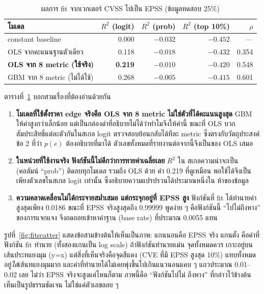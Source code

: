 \begin{table}[H]
\centering
\caption{ผลการ fit จากเวกเตอร์ CVSS ไปเป็น EPSS (ข้อมูลทดสอบ 25\%)}\label{tab:fit}
\footnotesize\setlength{\tabcolsep}{4pt}
\begin{tabular}{p{5.6cm}rrrr}
\toprule
โมเดล & $R^2$ (logit) & $R^2$ (prob) & $R^2$ (top 10\%) & $\rho$ \\
\midrule
constant baseline      & 0.000 & $-0.032$ & $-0.452$ & --- \\
OLS จากคะแนนฐานตัวเดียว & 0.118 & $-0.018$ & $-0.432$ & 0.354 \\
\textbf{OLS จาก 8 metric (ใช้จริง)} & \textbf{0.219} & $-0.010$ & $-0.420$ & 0.548 \\
GBM จาก 8 metric (ไม่ได้ใช้) & 0.268 & $-0.005$ & $-0.415$ & 0.601 \\
\bottomrule
\end{tabular}
\end{table}

ตารางที่~\ref{tab:fit} บอกสามเรื่องที่ต้องอ่านด้วยกัน

\begin{enumerate}[leftmargin=1.6em]
\item \textbf{โมเดลที่ใช้ตั้งราคา edge จริงคือ OLS จาก 8 metric ไม่ใช่ตัวที่ได้คะแนนสูงสุด}
GBM ให้ค่าสูงกว่าเล็กน้อย แต่เป็นกล่องดำที่อธิบายไม่ได้ว่าทำไมจึงให้ค่านี้ ขณะที่ OLS บวก
สัมประสิทธิ์แต่ละตัวกันในสเกล logit ตรวจสอบย้อนกลับได้ทีละ metric ซึ่งตรงกับวัตถุประสงค์
ข้อ 2 ที่ว่า $p(e)$ ต้องอธิบายที่มาได้ ตัวเลขทั้งหมดที่รายงานต่อจากนี้จึงเป็นของ OLS เสมอ
\item \textbf{ในหน่วยที่ใช้งานจริง ฟังก์ชันนี้ไม่ดีกว่าการทายค่าเฉลี่ยเลย} $R^2$ ใน
สเกลความน่าจะเป็น (คอลัมน์ ``prob'') ติดลบทุกโมเดล รวมถึง OLS ด้วย ค่า 0.219 ที่ดูเหมือน
พอใช้ได้จึงเป็นเพียงตัวเลขในสเกล logit เท่านั้น ซึ่งอธิบายความแปรปรวนได้ประมาณหนึ่งใน
ห้าของข้อมูล
\item \textbf{ความคลาดเคลื่อนไม่ได้กระจายสม่ำเสมอ แต่กระจุกอยู่ที่ EPSS สูง} ฟังก์ชันที่ fit
ได้ทำนายค่าสูงสุดเพียง 0.0186 ขณะที่ EPSS จริงสูงสุดถึง 0.99999 พูดง่าย ๆ คือฟังก์ชันนี้
``ไปไม่ถึงหาง'' ของการแจกแจง จึงถดถอยเข้าหาค่าฐาน (base rate) ที่ประมาณ 0.0055 แทน
\end{enumerate}

รูปที่~\ref{fig:fitscatter} แสดงข้อสามข้างต้นให้เห็นเป็นภาพ: แกนนอนคือ EPSS จริง แกนตั้ง
คือค่าที่ฟังก์ชัน fit ทำนาย (ทั้งสองแกนเป็น log scale) ถ้าฟังก์ชันทำนายแม่น จุดทั้งหมดควร
เกาะอยู่บนเส้นประทแยงมุม (y=x) แต่สิ่งที่เห็นจริงคือจุดสีแดง (CVE ที่มี EPSS สูงสุด 10\%)
แทบทั้งหมดอยู่\emph{ใต้}เส้นทแยงมุมมาก และค่าที่ทำนายได้ไม่เคยพุ่งขึ้นไปเกินแนวนอนแคบ ๆ
แถวประมาณ 0.01--0.02 เลย ไม่ว่า EPSS จริงจะสูงแค่ไหนก็ตาม ภาพนี้คือ ``ฟังก์ชันไปไม่
ถึงหาง'' ที่กล่าวไว้ข้างต้น เห็นเป็นรูปธรรมชัดเจน ไม่ใช่แค่ตัวเลขลอย ๆ

